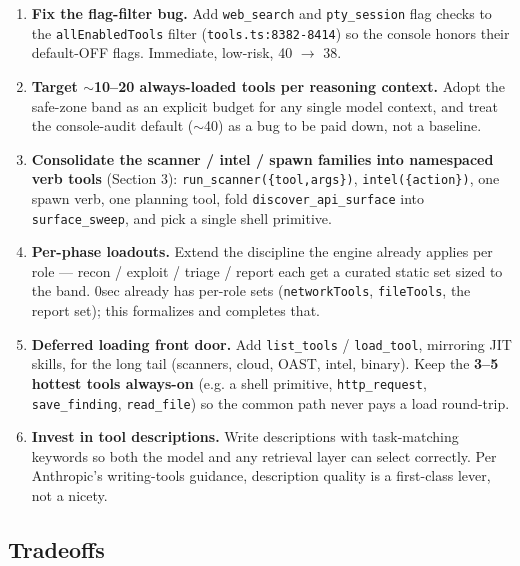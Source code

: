 \documentclass[11pt]{article}
\begin{document}
\begin{enumerate}[leftmargin=*]
  \item \textbf{Fix the flag-filter bug.} Add \texttt{web\_search} and
  \texttt{pty\_session} flag checks to the \texttt{allEnabledTools} filter
  (\texttt{tools.ts:8382-8414}) so the console honors their default-OFF flags.
  Immediate, low-risk, 40 $\rightarrow$ 38.
  \item \textbf{Target $\sim$10--20 always-loaded tools per reasoning context.}
  Adopt the safe-zone band as an explicit budget for any single model context,
  and treat the console-audit default ($\sim$40) as a bug to be paid down, not a
  baseline.
  \item \textbf{Consolidate the scanner / intel / spawn families into namespaced
  verb tools} (Section 3): \texttt{run\_scanner(\{tool,args\})},
  \texttt{intel(\{action\})}, one spawn verb, one planning tool, fold
  \texttt{discover\_api\_surface} into \texttt{surface\_sweep}, and pick a single
  shell primitive.
  \item \textbf{Per-phase loadouts.} Extend the discipline the engine already
  applies per role --- recon / exploit / triage / report each get a curated
  static set sized to the band. 0sec already has per-role sets
  (\texttt{networkTools}, \texttt{fileTools}, the report set); this formalizes and
  completes that.
  \item \textbf{Deferred loading front door.} Add \texttt{list\_tools} /
  \texttt{load\_tool}, mirroring JIT skills, for the long tail (scanners, cloud,
  OAST, intel, binary). Keep the \textbf{3--5 hottest tools always-on} (e.g. a
  shell primitive, \texttt{http\_request}, \texttt{save\_finding},
  \texttt{read\_file}) so the common path never pays a load round-trip.
  \item \textbf{Invest in tool descriptions.} Write descriptions with
  task-matching keywords so both the model and any retrieval layer can select
  correctly. Per Anthropic's writing-tools guidance, description quality is a
  first-class lever, not a nicety.
\end{enumerate}

\subsection{Tradeoffs}
\end{document}

